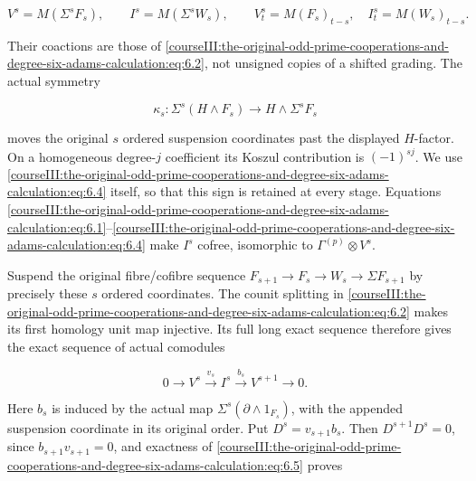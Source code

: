 \begin{equation}
V^s=M(\Sigma^sF_s),\qquad I^s=M(\Sigma^sW_s),
 \qquad V^s_t=M(F_s)_{t-s},\quad I^s_t=M(W_s)_{t-s}.
 \label{courseIII:the-original-odd-prime-cooperations-and-degree-six-adams-calculation:eq:6.3}
\end{equation}

Their coactions are those of \eqref{courseIII:the-original-odd-prime-cooperations-and-degree-six-adams-calculation:eq:6.2}, not unsigned copies of a shifted grading. The actual symmetry

\begin{equation}
\kappa_s:\Sigma^s(H\wedge F_s)\longrightarrow H\wedge\Sigma^sF_s
 \label{courseIII:the-original-odd-prime-cooperations-and-degree-six-adams-calculation:eq:6.4}
\end{equation}

moves the original \(s\) ordered suspension coordinates past the displayed \(H\)-factor. On a homogeneous degree-\(j\) coefficient its Koszul contribution is \((-1)^{sj}\). We use \eqref{courseIII:the-original-odd-prime-cooperations-and-degree-six-adams-calculation:eq:6.4} itself, so that this sign is retained at every stage. Equations \eqref{courseIII:the-original-odd-prime-cooperations-and-degree-six-adams-calculation:eq:6.1}--\eqref{courseIII:the-original-odd-prime-cooperations-and-degree-six-adams-calculation:eq:6.4} make \(I^s\) cofree, isomorphic to \(\Gamma^{(p)}\otimes V^s\).

Suspend the original fibre/cofibre sequence
\(F_{s+1}\to F_s\to W_s\to\Sigma F_{s+1}\) by precisely these \(s\) ordered coordinates. The counit splitting in \eqref{courseIII:the-original-odd-prime-cooperations-and-degree-six-adams-calculation:eq:6.2} makes its first homology unit map injective. Its full long exact sequence therefore gives the exact sequence of actual comodules

\begin{equation}
0\longrightarrow V^s\xrightarrow{v_s}I^s
 \xrightarrow{b_s}V^{s+1}\longrightarrow0.
 \label{courseIII:the-original-odd-prime-cooperations-and-degree-six-adams-calculation:eq:6.5}
\end{equation}

Here \(b_s\) is induced by the actual map \(\Sigma^s(\partial\wedge1_{F_s})\), with the appended suspension coordinate in its original order. Put \(D^s=v_{s+1}b_s\). Then \(D^{s+1}D^s=0\), since \(b_{s+1}v_{s+1}=0\), and exactness of \eqref{courseIII:the-original-odd-prime-cooperations-and-degree-six-adams-calculation:eq:6.5} proves

